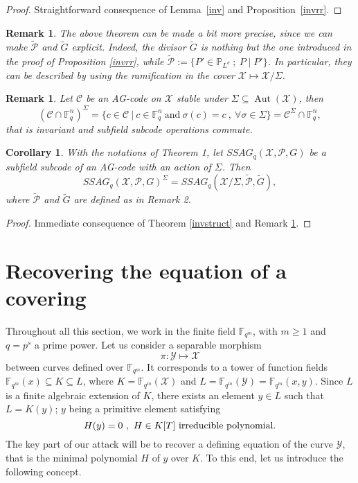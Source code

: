 \documentclass[10pt]{article}
\newtheorem{coro1}[thm]{Corollary}
\newtheorem{rq1}[thm]{Remark}
\newcommand{\s}{\vspace{0.3cm}}
\newcommand{\PP}{\mathbb{P}}
\newcommand{\fqm}{\mathbb{F}_{q^m}}
\newcommand{\fq}{\mathbb{F}_q}
\newcommand{\su}{\subseteq}
\newcommand{\X}{\mathcal{X}}
\newcommand{\Y}{\mathcal{Y}}
\newcommand{\PR}{\mathcal{P}}
\newcommand{\Aut}{\operatorname{Aut}}
\newcommand{\hugues}[1]{\textcolor{blue}{#1}}
\newcommand{\notehugues}[1]{\marginpar{\small\hugues{#1}}}
\begin{document}
\s
 
\begin{proof}
Straightforward consequence of Lemma~\ref{inv} and Proposition~\ref{invrr}.
\end{proof}

\s


\begin{rq1} \rm
The above theorem can be made a bit more precise, since we can make $\tilde{\PR}$ and $\tilde{G}$ explicit. Indeed, the divisor $\tilde{G}$ is nothing but the one introduced in the proof of Proposition \ref{invrr}, while $\tilde{\PR} := \{P' \in \PP_{L^{\sigma}} \ ; \ P \mid P'\}$. In particular, they can be described by using the ramification in the cover $\X \longmapsto \X/\Sigma$.
\end{rq1}

\s

\begin{rq1} \rm \label{commute}
Let $\mathcal{C}$ be an AG-code on $\X$ stable under $\Sigma \su \Aut(\X)$, then
\[(\mathcal{C}\cap \fq^n)^{\Sigma} = \{c \in \mathcal{C} \ | \ c \in \fq^n \ \textrm{and} \ \sigma(c)=c \ , \ \forall \sigma \in \Sigma\} = \mathcal{C}^{\Sigma} \cap \fq^n,\]
that is invariant and subfield subcode operations commute.
\end{rq1}

\s

\begin{coro1} \label{ssag}
With the notations of Theorem 1, let $SSAG_q(\X,\PR,G)$ be a subfield subcode of an AG-code with an action of $\Sigma$. Then 
\[SSAG_q(\X,\PR,G)^{\Sigma} = SSAG_q(\X/\Sigma,\tilde{\PR},\tilde{G}),\]
where $\tilde{\PR}$ and $\tilde{G}$ are defined as in Remark \rm 2.
\end{coro1}

\s

\begin{proof}
Immediate consequence of Theorem \ref{invstruct} and Remark \ref{commute}.
\end{proof}

\s

\section{Recovering the equation of a covering}


\s

Throughout all this section, we work in the finite field $\fqm$, with $m\geq 1$ and $q=p^s$ a prime power. Let us consider a separable morphism 
\[\pi : \Y \longmapsto \X\]
between curves defined over $\fqm$. It corresponds to a tower of function fields $\fqm(x) \su K \su L$,
\notehugues{$\pi$ correspond seulement à $K \su L$}
where $K=\fqm(\X)$ and $L=\fqm(\Y)=\fqm(x,y)$. Since $L$ is a finite  algebraic extension of $K$, there exists an element $y \in L$ such that $L=K(y)$; $y$ being a primitive element satisfying
\[ H(y)=0 \ , \ H \in K[T] \ \rm irreducible \ polynomial.\]
The key part of our attack will be to recover a defining equation of the curve $\Y$, that is the minimal polynomial $H$ of $y$ over $K$. To this end, let us introduce the following concept.
\end{document}
